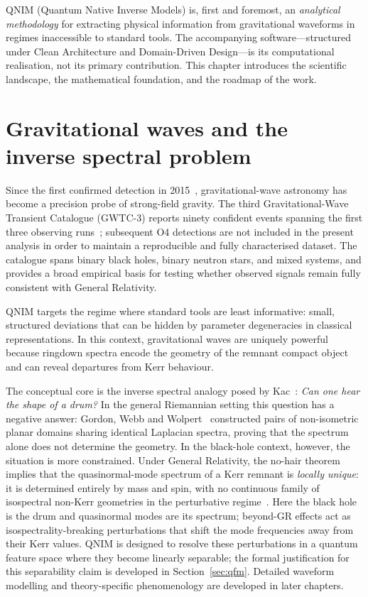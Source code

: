 \documentclass[11pt,a4paper, english]{book}
\theoremstyle{plain}
\theoremstyle{definition}
\numberwithin{equation}{chapter}
\numberwithin{figure}{chapter}
\numberwithin{table}{chapter}
\begin{document}
QNIM (Quantum Native Inverse Models) is, first and foremost, an
\emph{analytical methodology} for extracting physical information from
gravitational waveforms in regimes inaccessible to standard tools.
The accompanying software—structured under Clean Architecture and Domain-Driven
Design—is its computational realisation, not its primary contribution.
This chapter introduces the scientific landscape, the mathematical foundation,
and the roadmap of the work.

\section{Gravitational waves and the inverse spectral problem}
\label{sec:gw-landscape}

Since the first confirmed detection in 2015~\cite{Abbott_2016},
gravitational-wave astronomy has become a precision probe of strong-field
gravity.
The third Gravitational-Wave Transient Catalogue (GWTC-3) reports ninety
confident events spanning the first three observing
runs~\cite{GWTC3_2023}; subsequent O4 detections are not included in the
present analysis in order to maintain a reproducible and fully characterised
dataset.
The catalogue spans binary black holes, binary neutron stars, and mixed
systems, and provides a broad empirical basis for testing whether observed
signals remain fully consistent with General Relativity.

QNIM targets the regime where standard tools are least informative: small,
structured deviations that can be hidden by parameter degeneracies in classical
representations.
In this context, gravitational waves are uniquely powerful because ringdown
spectra encode the geometry of the remnant compact object and can reveal
departures from Kerr behaviour.

The conceptual core is the inverse spectral analogy posed by
Kac~\cite{Kac_1966}: \emph{Can one hear the shape of a drum?}
In the general Riemannian setting this question has a negative answer:
Gordon, Webb and Wolpert~\cite{Gordon_1992} constructed pairs of non-isometric
planar domains sharing identical Laplacian spectra, proving that the spectrum
alone does not determine the geometry.
In the black-hole context, however, the situation is more constrained.
Under General Relativity, the no-hair theorem implies that the quasinormal-mode
spectrum of a Kerr remnant is \emph{locally unique}: it is determined entirely
by mass and spin, with no continuous family of isospectral non-Kerr geometries
in the perturbative regime~\cite{Berti_2009}.
Here the black hole is the drum and quasinormal modes are its spectrum;
beyond-GR effects act as isospectrality-breaking perturbations that shift the
mode frequencies away from their Kerr values.
QNIM is designed to resolve these perturbations in a quantum feature space
where they become linearly separable; the formal justification for this
separability claim is developed in Section~\ref{sec:qfm}.
Detailed waveform modelling and theory-specific phenomenology are developed in
later chapters.
\end{document}

